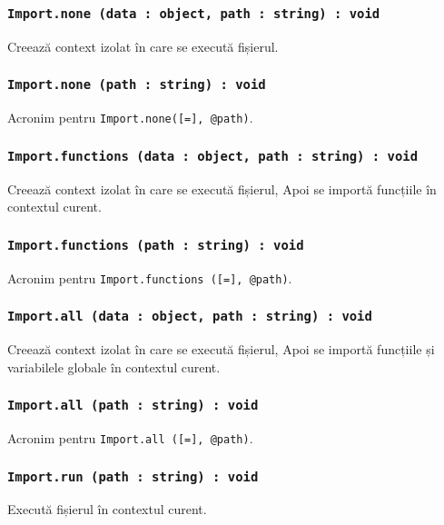 \subsubsection{\texttt{Import.none (data : object, path : string) : void}}

Creează context izolat în care se execută fișierul.

\subsubsection{\texttt{Import.none (path : string) : void}}

Acronim pentru \texttt{Import.none([=], @path)}.

\subsubsection{\texttt{Import.functions (data : object, path : string) : void}}

Creează context izolat în care se execută fișierul, Apoi se importă funcțiile în contextul curent.

\subsubsection{\texttt{Import.functions (path : string) : void}}

Acronim pentru \texttt{Import.functions ([=], @path)}.

\subsubsection{\texttt{Import.all (data : object, path : string) : void}}

Creează context izolat în care se execută fișierul, Apoi se importă funcțiile și variabilele globale în contextul curent.

\subsubsection{\texttt{Import.all (path : string) : void}}

Acronim pentru \texttt{Import.all ([=], @path)}.

\subsubsection{\texttt{Import.run (path : string) : void}}

Execută fișierul în contextul curent.

